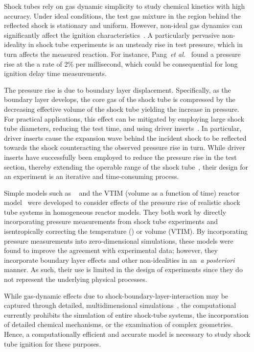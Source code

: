 	Shock tubes rely on gas dynamic simplicity to study chemical kinetics with high accuracy. Under ideal conditions, the test gas mixture 
	in the region behind the reflected shock is stationary and uniform. However, non-ideal gas dynamics can significantly affect the ignition characteristics~\cite{PETERSEN_HANSON_SW2001}. A particularly pervasive non-ideality in shock tube experiments is an unsteady rise in test pressure, which in turn affects the measured reaction. For instance, Pang~\emph{et al.}~\cite{PANG_DAVIDSON_HANSON_PCI32} found a pressure rise at the a rate of 2\% per millisecond, which could be consequential for long ignition delay time measurements.
	
	
	The pressure rise is due to boundary layer displacement. Specifically, as the boundary layer develops, the core gas of the shock tube is compressed by the decreasing effective volume of the shock tube yielding the increase in pressure. For practical applications, this effect can be mitigated by employing large shock tube diameters, reducing the test time, and using driver inserts~\cite{DAVIDSON_HANSON_SW2009}. In particular, driver inserts cause the expansion wave behind the incident shock to be reflected towards the shock counteracting the observed pressure rise in turn. While driver inserts have successfully been employed to reduce the pressure rise in the test section, thereby extending the operable range of the shock tube~\cite{HONG_PANG_VASU_DAVIDSON_HANSON_SW2009}, their design for an experiment is an iterative and time-consuming process.  
	
Simple models such as {}~\cite{LI_OWENS_DAVIDSON_HANSON_IJCK2008} and the VTIM (volume as a function of time) reactor model~\cite{CHAOS_DRYER_IJCK2010} were developed to consider effects of the pressure rise of realistic shock tube systems in homogeneous reactor models. They both work by directly incorporating pressure measurements from shock tube experiments and isentropically correcting the temperature ({}) or volume (VTIM). By incorporating pressure measurements into zero-dimensional simulations, these models were found to improve the agreement with experimental data; however, they incorporate boundary layer effects and other non-idealities in an~\emph{a posteriori} manner. As such, their use is limited in the design of experiments since they do not represent the underlying physical processes.
	
	While gas-dynamic effects due to shock-boundary-layer-interaction may be captured through detailed, multidimensional simulations~\cite{WEBER_ORAN_BORIS_ANDERSON_POF1995,YAMASHITA_CF12,GROGAN_PCI2015,Khokhlov_ICDERS15,GROGAN_PCI2017,LIPKOWICZ_SW2018}, the computational currently prohibits the simulation of entire shock-tube systems, the incorporation of detailed chemical mechanisms, or the examination of complex geometries. Hence, a computationally efficient and accurate model is necessary to study shock tube ignition for these purposes. 
	
